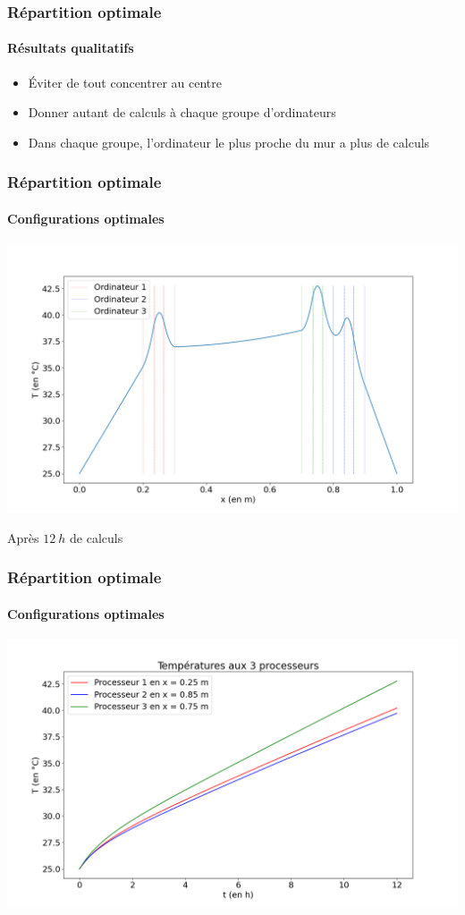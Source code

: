 \documentclass[a4paper,11pt]{beamer}
\begin{document}
\begin{frame}
    \frametitle{Répartition optimale}
    \framesubtitle{Résultats qualitatifs}

    \begin{itemize}
        \item Éviter de tout concentrer au centre
        \item Donner autant de calculs à chaque groupe d'ordinateurs
        \item Dans chaque groupe, l'ordinateur le plus proche du mur a plus de calculs
    \end{itemize}
\end{frame}

\begin{frame}
    \frametitle{Répartition optimale}
    \framesubtitle{Configurations optimales}

    \includegraphics[width=\textwidth]{min_position.png}

    \begin{center}
        Après $\SI{12}{h}$ de calculs
    \end{center}
\end{frame}

\begin{frame}
    \frametitle{Répartition optimale}
    \framesubtitle{Configurations optimales}

    \includegraphics[width=\textwidth]{min_temperature.png}
\end{frame}
\end{document}
